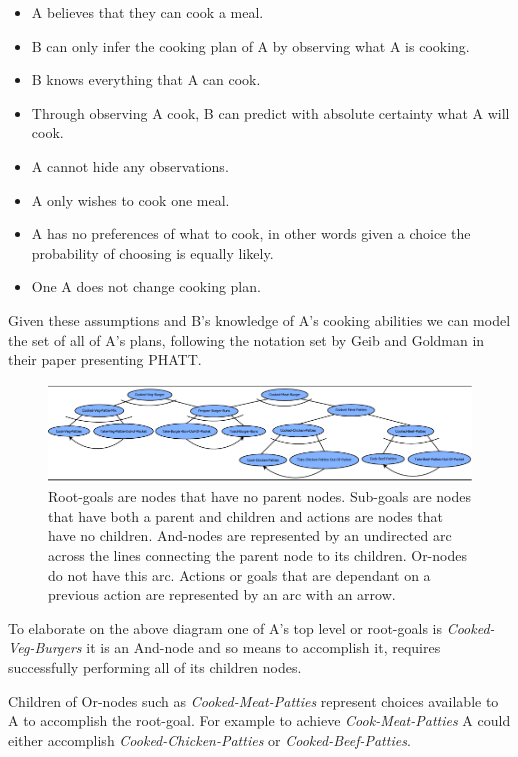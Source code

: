 \documentclass[parskip]{cs4rep}
\begin{document}
\begin{itemize}
\item
A believes that they can cook a meal.
\item
B can only infer the cooking plan of A by observing what A is cooking.
\item
B knows everything that A can cook.
\item
Through observing A cook, B can predict with absolute certainty what A will cook.
\item
A cannot hide any observations.
\item
A only wishes to cook one meal.
\item
A has no preferences of what to cook, in other words given a choice the probability of choosing is equally likely.
\item
One A does not change cooking plan.
\end{itemize}

Given these assumptions and B's knowledge of A's cooking abilities we can model the set of all of A's plans, following the notation set by Geib and Goldman in their paper presenting PHATT.

\begin{figure}[h]
\centerline{
	\includegraphics{images/example-plan-library}
}
\caption{Root-goals are nodes that have no parent nodes. Sub-goals are nodes that have both a parent and children and actions are nodes that have no children. And-nodes are represented by an undirected arc across the lines connecting the parent node to its children. Or-nodes do not have this arc. Actions or goals that are dependant on a previous action are represented by an arc with an arrow.}
\label{fig:example-plan-library}
\end{figure}

To elaborate on the above diagram one of A's top level or root-goals is \textit{Cooked-Veg-Burgers} it is an And-node and so means to accomplish it, requires successfully performing all of its children nodes. 

Children of Or-nodes such as \textit{Cooked-Meat-Patties} represent choices available to A to accomplish the root-goal. For example to achieve \textit{Cook-Meat-Patties} A could either accomplish \textit{Cooked-Chicken-Patties} or \textit{Cooked-Beef-Patties}.
\end{document}

